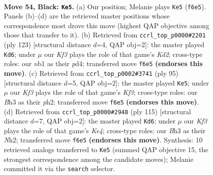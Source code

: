 \documentclass[11pt]{article}
\begin{document}
\clearpage

\begin{figure}[p]\centering
\begin{subfigure}{0.46\textwidth}\centering
\resizebox{\linewidth}{!}{%
\newchessgame
\chessboard[
  setfen={8/B7/p4k2/8/2p5/7b/5K2/1N6 b - - 7 54},
  showmover=false,
  pgfstyle=straightmove, color=movearrow, markmove={f6-e5}
]}
\caption{}
\end{subfigure}\hfill
\begin{subfigure}{0.46\textwidth}\centering
\resizebox{\linewidth}{!}{%
\newchessgame
\chessboard[
  setfen={8/3k4/8/3p2K1/3P4/3b4/3B4/8 b - - 15 62},
  showmover=false,
  pgfstyle=straightmove, color=movearrow, markmove={d7-d6}
]}
\caption{}
\end{subfigure}
\\[4pt]
\begin{subfigure}{0.46\textwidth}\centering
\resizebox{\linewidth}{!}{%
\newchessgame
\chessboard[
  setfen={6B1/8/p4k2/7p/8/1K6/7P/8 b - - 0 48},
  showmover=false,
  pgfstyle=straightmove, color=movearrow, markmove={f6-e5}
]}
\caption{}
\end{subfigure}\hfill
\begin{subfigure}{0.46\textwidth}\centering
\resizebox{\linewidth}{!}{%
\newchessgame
\chessboard[
  setfen={8/5B2/8/P3k1p1/8/1K6/7n/8 b - - 0 58},
  showmover=false,
  pgfstyle=straightmove, color=movearrow, markmove={e5-d6}
]}
\caption{}
\end{subfigure}
\caption{\textbf{Move 54, Black: \texttt{Ke5}.} (a) Our position; Melanie plays \texttt{Ke5} (\texttt{f6e5}). Panels (b)--(d) are the retrieved master positions whose correspondence most drove this move (highest QAP objective among those that transfer to it). (b) Retrieved from \texttt{ccrl\_top\_p0000\#2201} (ply 123) [structural distance $d$=4, QAP obj=2]: the master played \texttt{Kd6}; under $\mu$ our \emph{Kf3} plays the role of that game's \emph{Kd2}; cross-type roles: our \emph{n}b1 as their \emph{p}d4; transferred move \texttt{f6e5} \textbf{(endorses this move)}. (c) Retrieved from \texttt{ccrl\_top\_p0002\#3741} (ply 95) [structural distance $d$=5, QAP obj=2]: the master played \texttt{Ke5}; under $\mu$ our \emph{Kf3} plays the role of that game's \emph{Kf3}; cross-type roles: our \emph{B}h3 as their \emph{p}h2; transferred move \texttt{f6e5} \textbf{(endorses this move)}. (d) Retrieved from \texttt{ccrl\_top\_p0000\#2948} (ply 115) [structural distance $d$=7, QAP obj=2]: the master played \texttt{Kd6}; under $\mu$ our \emph{Kf3} plays the role of that game's \emph{Ke4}; cross-type roles: our \emph{B}h3 as their \emph{N}h2; transferred move \texttt{f6e5} \textbf{(endorses this move)}. Synthesis: 10 retrieved analogs transferred to \texttt{Ke5} (summed QAP objective 15, the strongest correspondence among the candidate moves); Melanie committed it via the \texttt{search} selector.}
\label{fig:thought-m107}
\end{figure}
\end{document}
